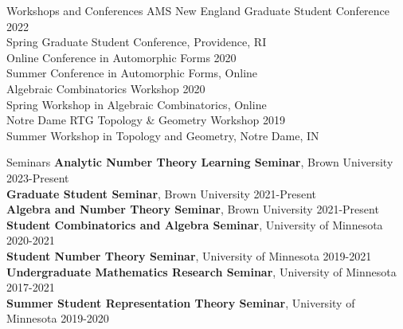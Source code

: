 \documentclass{resume} %
\begin{document}
\begin{rSection}{Workshops and Conferences}
    {AMS New England Graduate Student Conference} \hfill {2022} \\
    \hphantom{\quad}Spring Graduate Student Conference, Providence, RI \\
    {Online Conference in Automorphic Forms} \hfill {2020} \\
    \hphantom{\quad}Summer Conference in Automorphic Forms, Online \\
    {Algebraic Combinatorics Workshop} \hfill {2020} \\
    \hphantom{\quad}Spring Workshop in Algebraic Combinatorics, Online \\
    {Notre Dame RTG Topology \& Geometry Workshop} \hfill {2019} \\
    \hphantom{\quad}Summer Workshop in Topology and Geometry, Notre Dame, IN
\end{rSection}

\begin{rSection}{Seminars}
    {\bf Analytic Number Theory Learning Seminar}, Brown University \hfill {2023-Present} \\
    {\bf Graduate Student Seminar}, Brown University \hfill {2021-Present} \\
    {\bf Algebra and Number Theory Seminar}, Brown University \hfill {2021-Present} \\
    {\bf Student Combinatorics and Algebra Seminar}, University of Minnesota \hfill {2020-2021} \\
    {\bf Student Number Theory Seminar}, University of Minnesota \hfill {2019-2021} \\
    {\bf Undergraduate Mathematics Research Seminar}, University of Minnesota \hfill {2017-2021} \\
    {\bf Summer Student Representation Theory Seminar}, University of Minnesota \hfill {2019-2020} \\
\end{rSection}
\end{document}

